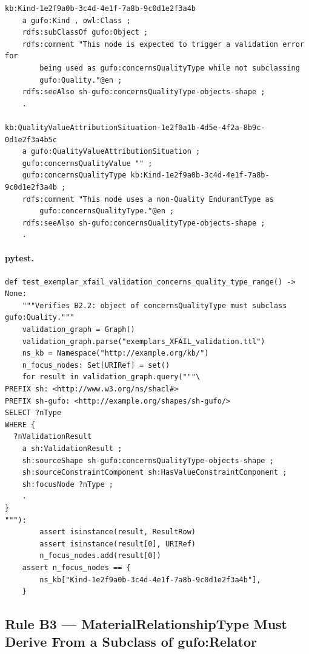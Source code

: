 \documentclass[12pt,a4paper]{article}
\begin{document}
\begin{lstlisting}[style=turtlestyle]
kb:Kind-1e2f9a0b-3c4d-4e1f-7a8b-9c0d1e2f3a4b
    a gufo:Kind , owl:Class ;
    rdfs:subClassOf gufo:Object ;
    rdfs:comment "This node is expected to trigger a validation error for
        being used as gufo:concernsQualityType while not subclassing
        gufo:Quality."@en ;
    rdfs:seeAlso sh-gufo:concernsQualityType-objects-shape ;
    .

kb:QualityValueAttributionSituation-1e2f0a1b-4d5e-4f2a-8b9c-0d1e2f3a4b5c
    a gufo:QualityValueAttributionSituation ;
    gufo:concernsQualityValue "" ;
    gufo:concernsQualityType kb:Kind-1e2f9a0b-3c4d-4e1f-7a8b-9c0d1e2f3a4b ;
    rdfs:comment "This node uses a non-Quality EndurantType as
        gufo:concernsQualityType."@en ;
    rdfs:seeAlso sh-gufo:concernsQualityType-objects-shape ;
    .
\end{lstlisting}

\paragraph{pytest.}

\begin{lstlisting}[style=pythonstyle]
def test_exemplar_xfail_validation_concerns_quality_type_range() -> None:
    """Verifies B2.2: object of concernsQualityType must subclass gufo:Quality."""
    validation_graph = Graph()
    validation_graph.parse("exemplars_XFAIL_validation.ttl")
    ns_kb = Namespace("http://example.org/kb/")
    n_focus_nodes: Set[URIRef] = set()
    for result in validation_graph.query("""\
PREFIX sh: <http://www.w3.org/ns/shacl#>
PREFIX sh-gufo: <http://example.org/shapes/sh-gufo/>
SELECT ?nType
WHERE {
  ?nValidationResult
    a sh:ValidationResult ;
    sh:sourceShape sh-gufo:concernsQualityType-objects-shape ;
    sh:sourceConstraintComponent sh:HasValueConstraintComponent ;
    sh:focusNode ?nType ;
    .
}
"""):
        assert isinstance(result, ResultRow)
        assert isinstance(result[0], URIRef)
        n_focus_nodes.add(result[0])
    assert n_focus_nodes == {
        ns_kb["Kind-1e2f9a0b-3c4d-4e1f-7a8b-9c0d1e2f3a4b"],
    }
\end{lstlisting}

\subsection{Rule B3 --- MaterialRelationshipType Must Derive From a Subclass of gufo:Relator}
\label{sec:rule-b3}
\end{document}
